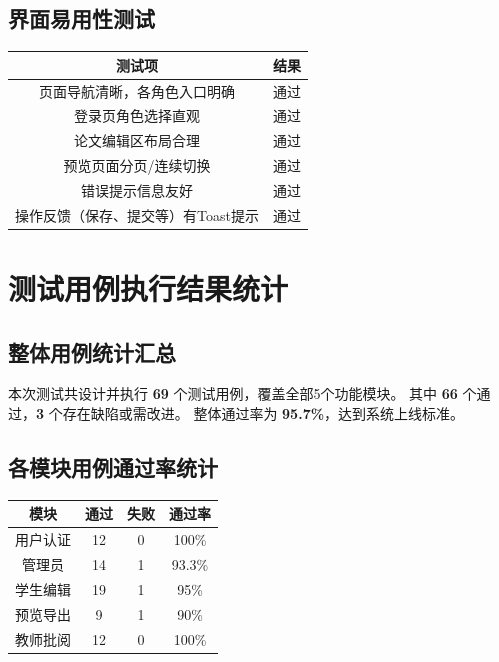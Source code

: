 \documentclass[a4paper,12pt]{article}
\begin{document}
\subsection{界面易用性测试}
\begin{center}
\begin{tabular}{|c|c|}
\hline
测试项 & 结果 \\
\hline
页面导航清晰，各角色入口明确 & 通过 \\
登录页角色选择直观 & 通过 \\
论文编辑区布局合理 & 通过 \\
预览页面分页/连续切换 & 通过 \\
错误提示信息友好 & 通过 \\
操作反馈（保存、提交等）有Toast提示 & 通过 \\
\hline
\end{tabular}
\end{center}

\section{测试用例执行结果统计}

\subsection{整体用例统计汇总}
本次测试共设计并执行 \textbf{69} 个测试用例，覆盖全部5个功能模块。
其中 \textbf{66} 个通过，\textbf{3} 个存在缺陷或需改进。
整体通过率为 \textbf{95.7\%}，达到系统上线标准。

\subsection{各模块用例通过率统计}
\begin{center}
\begin{tabular}{|c|c|c|c|}
\hline
模块 & 通过 & 失败 & 通过率 \\
\hline
用户认证 & 12 & 0 & 100\% \\
管理员 & 14 & 1 & 93.3\% \\
学生编辑 & 19 & 1 & 95\% \\
预览导出 & 9 & 1 & 90\% \\
教师批阅 & 12 & 0 & 100\% \\
\hline
\end{tabular}
\end{center}
\end{document}
